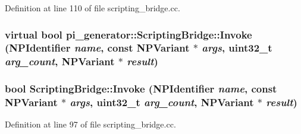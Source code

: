 Definition at line 110 of file scripting\_\-bridge.cc.

\hypertarget{classpi__generator_1_1_scripting_bridge_aed0d146930d7db6a548993629bb775f6}{
\subsubsection[{Invoke}]{\setlength{\rightskip}{0pt plus 5cm}virtual bool pi\_\-generator::ScriptingBridge::Invoke (NPIdentifier {\em name}, \/  const NPVariant $\ast$ {\em args}, \/  uint32\_\-t {\em arg\_\-count}, \/  NPVariant $\ast$ {\em result})}}
\label{classpi__generator_1_1_scripting_bridge_aed0d146930d7db6a548993629bb775f6}
\hypertarget{classpi__generator_1_1_scripting_bridge_ad18d2af321b2cba1235876cf281295df}{
\subsubsection[{Invoke}]{\setlength{\rightskip}{0pt plus 5cm}bool ScriptingBridge::Invoke (NPIdentifier {\em name}, \/  const NPVariant $\ast$ {\em args}, \/  uint32\_\-t {\em arg\_\-count}, \/  NPVariant $\ast$ {\em result})}}
\label{classpi__generator_1_1_scripting_bridge_ad18d2af321b2cba1235876cf281295df}


Definition at line 97 of file scripting\_\-bridge.cc.

